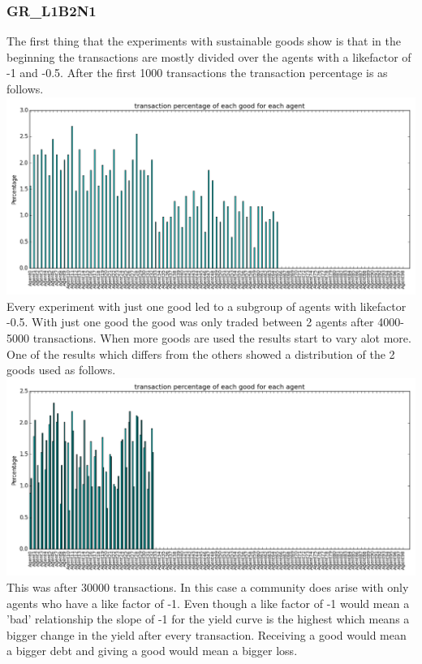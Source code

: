 \documentclass[twoside,openright]{uva-bachelor-thesis}
\begin{document}
\subsubsection{GR\_L1B2N1}
The first thing that the experiments with sustainable goods show is that in the beginning the transactions are mostly divided over the agents with a likefactor of -1 and -0.5. After the first 1000 transactions the transaction percentage is as follows. \\
\includegraphics[scale=0.5]{GR_L1B2N1/1000transactions}
 Every experiment with just one good led to a subgroup of agents with likefactor -0.5. With just one good the good was  only traded between 2 agents after 4000-5000 transactions. When more goods are used the results start to vary alot more. One of the results which differs from the others showed a distribution of the 2 goods used as follows. \\
\includegraphics[scale=0.5]{GR_L1B2N1/30000transaction2}
This was after 30000 transactions. In this case a community does arise with only agents who have a like factor of -1. Even though a like factor of -1 would mean a 'bad' relationship the slope of -1 for the yield curve is the highest which means a bigger change in the yield after every transaction. Receiving a good would mean a bigger debt and giving a good would mean a bigger loss.
\end{document}
